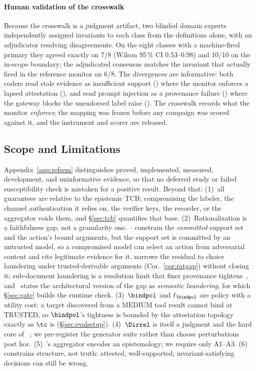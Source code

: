 \paragraph*{Human validation of the crosswalk}
Because the crosswalk is a judgment artifact, two blinded domain
experts independently assigned invariants to each class from the
definitions alone, with an adjudicator resolving disagreements. On the
eight classes with a machine-fired primary they agreed exactly on 7/8
(Wilson 95\,\% CI 0.53--0.98) and 10/10 on the in-scope boundary; the
adjudicated consensus matches the invariant that actually fired in the
reference monitor on 6/8. The divergences are informative: both coders
read stale evidence as insufficient support (\Ithree) where the monitor
enforces a lapsed attestation (\Ione), and read prompt injection as a
provenance failure (\Ione) where the gateway blocks the unendorsed
label raise (\Itwo). The crosswalk records what the monitor
\emph{enforces}; the mapping was frozen before any campaign was scored
against it, and the instrument and scorer are released.

\subsection{Scope and Limitations}
\label{sec:limitations}
Appendix~\ref{app:refsem} distinguishes proved, implemented, measured,
development, and uninformative evidence, so that no deferred study or
failed susceptibility check is mistaken for a positive result. Beyond
that: (1)~all guarantees are relative to the epistemic TCB; compromising
the labeler, the channel authentication it relies on, the verifier
keys, the recorder, or the aggregator voids them, and \S\ref{sec:tcb}
quantifies that base. (2)~Rationalization is a faithfulness gap, not a
granularity one. \Ione--\Ifour{} constrain the \emph{committed} support
set and the action's bound arguments, but the support set is committed
by an untrusted model, so a compromised model can select an action from
adversarial content and cite legitimate evidence for it. \Ifour{}
narrows the residual to choice laundering under trusted-derivable
arguments (Cor.~\ref{cor:ratgap}) without closing it; sub-document
laundering is a resolution limit that finer provenance
tightens~\cite{argus,cxi}, and~\cite{romanchuk2026semantic} states the
architectural version of the gap as \emph{semantic laundering}, for
which \S\ref{sec:gate} builds the runtime check. (3)~$\bindpol$ and
$\ell_{\bindpol}$ are policy with a utility cost: a target discovered
from a $\mathrm{MEDIUM}$ tool result cannot bind at $\mathrm{TRUSTED}$,
so $\bindpol$'s tightness is bounded by the attestation topology
exactly as $\tc$ is (\S\ref{sec:evalsetup}). (4)~$\Dirrel$ is itself a judgment
and the hard core of \Ifive~\cite{qu}; we pre-register the generator
suite rather than choose perturbations post hoc. (5)~\Ithree's
aggregator encodes an epistemology; we require only A1--A3.
(6)~\DEI{} constrains structure, not truth: attested, well-supported,
invariant-satisfying decisions can still be wrong.
